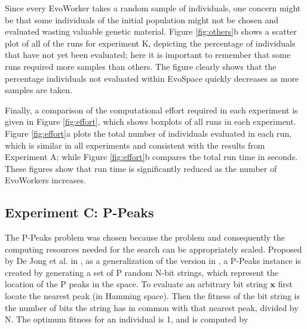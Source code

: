 Since every EvoWorker takes a random sample of individuals, one concern might be that some individuals of the initial population might
not be chosen and evaluated wasting valuable genetic material.
Figure \ref{fig:others}b shows a scatter plot of all of the runs for experiment K, depicting the percentage of individuals
that have not yet been evaluated; here it is important to remember that some runs required more samples than others.
The figure clearly shows that the percentage individuals not evaluated within EvoSpace quickly decreases as more samples are taken.

Finally, a comparison of the computational effort required in each experiment is given in
Figure \ref{fig:effort}, which shows boxplots of all runs in each experiment.
Figure \ref{fig:effort}a plots the total number of individuals evaluated in each run, which is similar in all experiments
and consistent with the results from Experiment A;
while Figure \ref{fig:effort}b compares the total run time in seconds.
These figures show that run time is significantly reduced as the number of EvoWorkers increases.



\subsection{Experiment C: P-Peaks}
\label{expb}

The P-Peaks problem was chosen because the problem and consequently the computing resources needed for the search can be appropriately scaled.
Proposed by De Jong et al. in \cite{Jong:PS97}, as a generalization of the version in \cite{Jong:1990}, a
P-Peaks instance is created by generating a set of P random N-bit
strings, which represent the location of the P peaks in the space. To
evaluate an arbitrary bit string \begin{math} \mathbf{x} \end{math}
first locate the nearest peak (in Hamming space). Then the fitness of
the bit string is the number of bits the string has in common with
that nearest peak, divided by N. The optimum fitness for an individual
is 1, and is computed by

